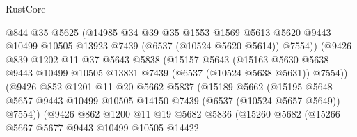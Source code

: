 \begin{lexlean}{RustCore}
\begin{coremodule}
                          @844
                          @35
                          @5625
                          (@14985
                            @34
                            @39
                            @35
                            @1553
                            @1569
                            @5613
                            @5620
                            @9443
                            @10499
                            @10505
                            @13923
                            @7439
                            (@6537 (@10524 @5620 @5614))
                            @7554))
                        (@9426
                          @839
                          @1202
                          @11
                          @37
                          @5643
                          @5838
                          (@15157
                            @5643
                            (@15163
                              @5630
                              @5638
                              @9443
                              @10499
                              @10505
                              @13831
                              @7439
                              (@6537 (@10524 @5638 @5631))
                              @7554))
                          (@9426
                            @852
                            @1201
                            @11
                            @20
                            @5662
                            @5837
                            (@15189
                              @5662
                              (@15195
                                @5648
                                @5657
                                @9443
                                @10499
                                @10505
                                @14150
                                @7439
                                (@6537 (@10524 @5657 @5649))
                                @7554))
                            (@9426
                              @862
                              @1200
                              @11
                              @19
                              @5682
                              @5836
                              (@15260
                                @5682
                                (@15266
                                  @5667
                                  @5677
                                  @9443
                                  @10499
                                  @10505
                                  @14422

\end{coremodule}
\end{lexlean}

